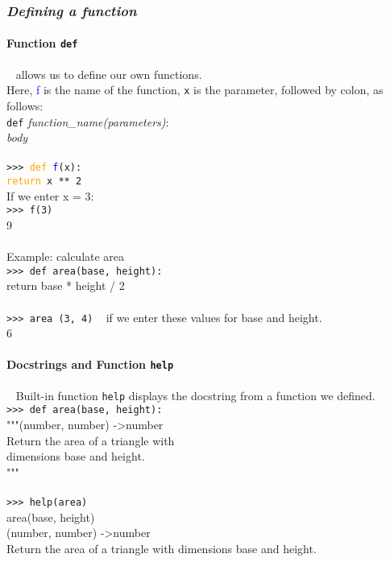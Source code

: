 \documentclass{article}
\begin{document}
{{{\subsubsection{\small\textsl{Defining a function}}
\paragraph{Function \texttt{def}} ~ allows us to define our own functions.\\
Here, \textcolor{blue}{f} is the name of the function, \texttt{x} is the parameter, followed by colon, as follows:\\
\texttt{def} \textit{function\_name(parameters)}: \\
\indent \textit{body}\\
\\
\texttt{>>> \textcolor{orange}{def} \textcolor{blue}{f}(x):}\\
\indent \indent \indent \texttt{\textcolor{orange}{return} x ** 2}\\
If we enter x = 3:\\
\texttt{>>> f(3)} \\
9 \\
\\
Example: calculate area\\
\texttt{>>> def area(base, height):}\\
\indent \indent \indent return base * height / 2\\
\\
\texttt{>>> area (3, 4)} ~ if we enter these values for base and height.\\
6\\
\paragraph{Docstrings and Function \texttt{help}} ~ Built-in function \texttt{help} displays the docstring from a function we defined. \\
\texttt{>>> def area(base, height):}\\
\indent \indent \indent """(number, number) -\textgreater  number \\
\indent \indent \indent Return the area of a triangle with\\ \indent \indent \indent dimensions base and height.\\
\indent \indent \indent """ \\
\\
\texttt{>>> help(area)}\\
area(base, height)\\
\indent (number, number) -\textgreater  number\\
\indent Return the area of a triangle with dimensions base and height.\\


}}}
\end{document}

